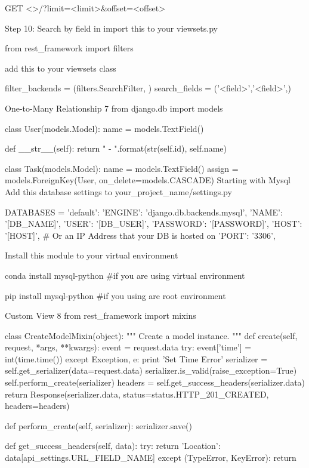 GET <>/?limit=<limit>&offset=<offset>

Step 10: Search by field in
import this to your viewsets.py


from rest_framework import filters

add this to your viewsets class


filter_backends = (filters.SearchFilter, )
search_fields = ('<field>','<field>',)

One-to-Many Relationship 7
from django.db import models

class User(models.Model):
    name = models.TextField()

    def __str__(self):
        return "{} - {}".format(str(self.id), self.name)


class Task(models.Model):
    name = models.TextField()
    assign = models.ForeignKey(User, on_delete=models.CASCADE)
Starting with Mysql
Add this database settings to your_project_name/settings.py


DATABASES = {
    'default': {
        'ENGINE': 'django.db.backends.mysql',
        'NAME': '[DB_NAME]',
        'USER': '[DB_USER]',
        'PASSWORD': '[PASSWORD]',
        'HOST': '[HOST]',   # Or an IP Address that your DB is hosted on
        'PORT': '3306',
    }
}

Install this module to your virtual environment


conda install mysql-python #if you are using virtual environment

pip install mysql-python #if you using are root environment

Custom View 8
from rest_framework import mixins


class CreateModelMixin(object):
    """
    Create a model instance.
    """
    def create(self, request, *args, **kwargs):
        event = request.data
        try:
            event['time'] = int(time.time())
        except Exception, e:
            print 'Set Time Error'
        serializer = self.get_serializer(data=request.data)
        serializer.is_valid(raise_exception=True)
        self.perform_create(serializer)
        headers = self.get_success_headers(serializer.data)
        return Response(serializer.data, status=status.HTTP_201_CREATED, headers=headers)

    def perform_create(self, serializer):
        serializer.save()

    def get_success_headers(self, data):
        try:
            return {'Location': data[api_settings.URL_FIELD_NAME]}
        except (TypeError, KeyError):
            return {}

